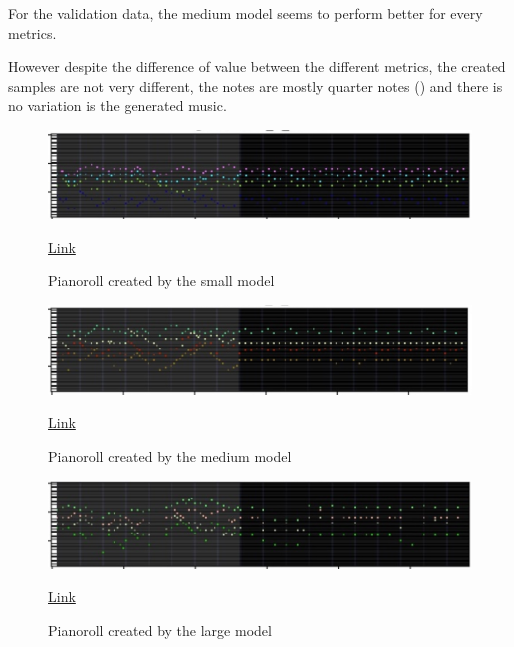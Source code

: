 \documentclass[12pt]{report}
\begin{document}
For the validation data, the medium model seems to perform better for every metrics.

However despite the difference of value between the different metrics, the created samples are not very different, the notes are mostly quarter notes (\musQuarter) and there is no variation is the generated music.

\begin{figure}[htbp]
    \centering
    \includegraphics[width=\textwidth]{images/experiences/size/generation-comparison-size-small.jpg}
    \caption{Pianoroll created by the small model}
    \href{https://github.com/ValentinVignal/midiGenerator/blob/master/samples/mode-size-comparison/small.mid}{Link}
    \label{fig:exp:size:generation-small}
\end{figure}

\begin{figure}[htbp]
    \centering
    \includegraphics[width=\textwidth]{images/experiences/size/generation-comparison-size-medium.jpg}
    \caption{Pianoroll created by the medium model}
    \href{https://github.com/ValentinVignal/midiGenerator/blob/master/samples/mode-size-comparison/medium.mid}{Link}
    \label{fig:exp:size:generation-medium}
\end{figure}

\begin{figure}[htbp]
    \centering
    \includegraphics[width=\textwidth]{images/experiences/size/generation-comparison-size-large.jpg}
    \caption{Pianoroll created by the large model}
    \href{https://github.com/ValentinVignal/midiGenerator/blob/master/samples/mode-size-comparison/large.mid}{Link}
    \label{fig:exp:size:generation-large}
\end{figure}
\end{document}
